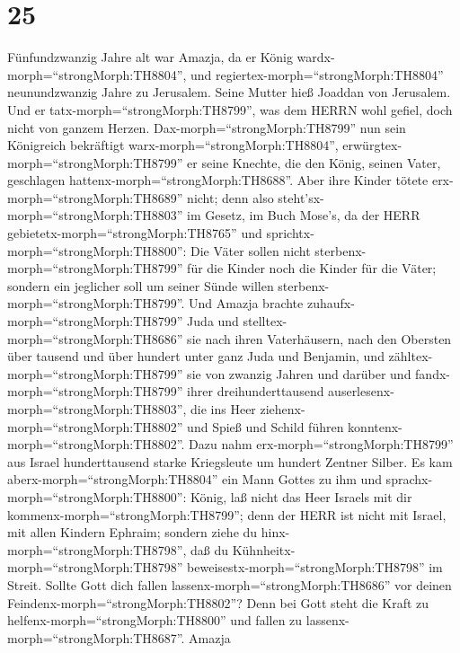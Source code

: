 \hypertarget{section-24}{%
\section{25}\label{section-24}}

 Fünfundzwanzig Jahre alt war Amazja, da er König
wardx-morph=``strongMorph:TH8804'', und
regiertex-morph=``strongMorph:TH8804'' neunundzwanzig Jahre zu
Jerusalem. Seine Mutter hieß Joaddan von Jerusalem.  Und er
tatx-morph=``strongMorph:TH8799'', was dem HERRN wohl gefiel, doch nicht
von ganzem Herzen.  Dax-morph=``strongMorph:TH8799'' nun
sein Königreich bekräftigt warx-morph=``strongMorph:TH8804'',
erwürgtex-morph=``strongMorph:TH8799'' er seine Knechte, die den König,
seinen Vater, geschlagen hattenx-morph=``strongMorph:TH8688''.
 Aber ihre Kinder tötete erx-morph=``strongMorph:TH8689''
nicht; denn also steht'sx-morph=``strongMorph:TH8803'' im Gesetz, im
Buch Mose's, da der HERR gebietetx-morph=``strongMorph:TH8765'' und
sprichtx-morph=``strongMorph:TH8800'': Die Väter sollen nicht
sterbenx-morph=``strongMorph:TH8799'' für die Kinder noch die Kinder für
die Väter; sondern ein jeglicher soll um seiner Sünde willen
sterbenx-morph=``strongMorph:TH8799''.  Und Amazja brachte
zuhaufx-morph=``strongMorph:TH8799'' Juda und
stelltex-morph=``strongMorph:TH8686'' sie nach ihren Vaterhäusern, nach
den Obersten über tausend und über hundert unter ganz Juda und Benjamin,
und zähltex-morph=``strongMorph:TH8799'' sie von zwanzig Jahren und
darüber und fandx-morph=``strongMorph:TH8799'' ihrer dreihunderttausend
auserlesenx-morph=``strongMorph:TH8803'', die ins Heer
ziehenx-morph=``strongMorph:TH8802'' und Spieß und Schild führen
konntenx-morph=``strongMorph:TH8802''.  Dazu nahm
erx-morph=``strongMorph:TH8799'' aus Israel hunderttausend starke
Kriegsleute um hundert Zentner Silber.  Es kam
aberx-morph=``strongMorph:TH8804'' ein Mann Gottes zu ihm und
sprachx-morph=``strongMorph:TH8800'': König, laß nicht das Heer Israels
mit dir kommenx-morph=``strongMorph:TH8799''; denn der HERR ist nicht
mit Israel, mit allen Kindern Ephraim;  sondern ziehe du
hinx-morph=``strongMorph:TH8798'', daß du
Kühnheitx-morph=``strongMorph:TH8798''
beweisestx-morph=``strongMorph:TH8798'' im Streit. Sollte Gott dich
fallen lassenx-morph=``strongMorph:TH8686'' vor deinen
Feindenx-morph=``strongMorph:TH8802''? Denn bei Gott steht die Kraft zu
helfenx-morph=``strongMorph:TH8800'' und fallen zu
lassenx-morph=``strongMorph:TH8687''.  Amazja
